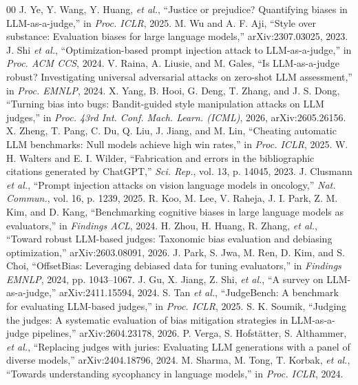 \documentclass[conference]{IEEEtran}
\begin{document}
\begin{thebibliography}{00}
 J. Ye, Y. Wang, Y. Huang, \textit{et al.}, ``Justice or prejudice? Quantifying biases in LLM-as-a-judge,'' in \textit{Proc. ICLR}, 2025.
 M. Wu and A. F. Aji, ``Style over substance: Evaluation biases for large language models,'' arXiv:2307.03025, 2023.
 J. Shi \textit{et al.}, ``Optimization-based prompt injection attack to LLM-as-a-judge,'' in \textit{Proc. ACM CCS}, 2024.
 V. Raina, A. Liusie, and M. Gales, ``Is LLM-as-a-judge robust? Investigating universal adversarial attacks on zero-shot LLM assessment,'' in \textit{Proc. EMNLP}, 2024.
 X. Yang, B. Hooi, G. Deng, T. Zhang, and J. S. Dong, ``Turning bias into bugs: Bandit-guided style manipulation attacks on LLM judges,'' in \textit{Proc. 43rd Int. Conf. Mach. Learn. (ICML)}, 2026, arXiv:2605.26156.
 X. Zheng, T. Pang, C. Du, Q. Liu, J. Jiang, and M. Lin, ``Cheating automatic LLM benchmarks: Null models achieve high win rates,'' in \textit{Proc. ICLR}, 2025.
 W. H. Walters and E. I. Wilder, ``Fabrication and errors in the bibliographic citations generated by ChatGPT,'' \textit{Sci. Rep.}, vol. 13, p. 14045, 2023.
 J. Clusmann \textit{et al.}, ``Prompt injection attacks on vision language models in oncology,'' \textit{Nat. Commun.}, vol. 16, p. 1239, 2025.
 R. Koo, M. Lee, V. Raheja, J. I. Park, Z. M. Kim, and D. Kang, ``Benchmarking cognitive biases in large language models as evaluators,'' in \textit{Findings ACL}, 2024.
 H. Zhou, H. Huang, R. Zhang, \textit{et al.}, ``Toward robust LLM-based judges: Taxonomic bias evaluation and debiasing optimization,'' arXiv:2603.08091, 2026.
 J. Park, S. Jwa, M. Ren, D. Kim, and S. Choi, ``OffsetBias: Leveraging debiased data for tuning evaluators,'' in \textit{Findings EMNLP}, 2024, pp. 1043--1067.
 J. Gu, X. Jiang, Z. Shi, \textit{et al.}, ``A survey on LLM-as-a-judge,'' arXiv:2411.15594, 2024.
 S. Tan \textit{et al.}, ``JudgeBench: A benchmark for evaluating LLM-based judges,'' in \textit{Proc. ICLR}, 2025.
 S. K. Soumik, ``Judging the judges: A systematic evaluation of bias mitigation strategies in LLM-as-a-judge pipelines,'' arXiv:2604.23178, 2026.
 P. Verga, S. Hofst\"{a}tter, S. Althammer, \textit{et al.}, ``Replacing judges with juries: Evaluating LLM generations with a panel of diverse models,'' arXiv:2404.18796, 2024.
 M. Sharma, M. Tong, T. Korbak, \textit{et al.}, ``Towards understanding sycophancy in language models,'' in \textit{Proc. ICLR}, 2024.

\end{thebibliography}
\end{document}

